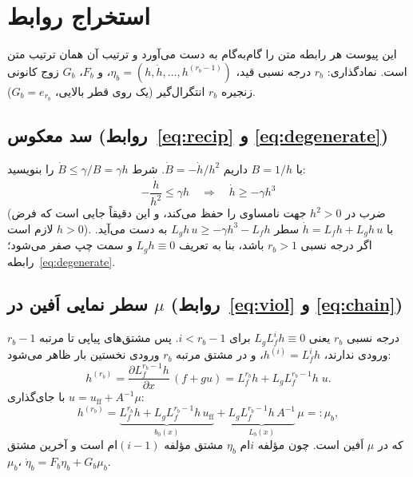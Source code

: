 \documentclass[10pt,twocolumn]{article}
\begin{document}
\onecolumn
\setcounter{section}{0}
\renewcommand{\thesection}{پ}
\renewcommand{\thesubsection}{پ-\arabic{subsection}}
\section{استخراج روابط}
\label{app:deriv}
این پیوست هر رابطه متن را گام‌به‌گام به دست می‌آورد و ترتیب آن همان ترتیب متن است.
نمادگذاری: $r_b$ درجه نسبی قید، $\eta_b=(h,\dot h,\ldots,h^{(r_b-1)})$، و
$F_b$، $G_b$ زوج کانونی زنجیره $r_b$ انتگرال‌گیر (یک روی قطر بالایی، $G_b=e_{r_b}$).

\subsection{سد معکوس (روابط~\eqref{eq:recip} و \eqref{eq:degenerate})}
با $B=1/h$ داریم $\dot B=-\dot h/h^{2}$. شرط $\dot B\le\gamma/B=\gamma h$ را بنویسید:
\begin{equation*}
    -\frac{\dot h}{h^{2}}\le\gamma h
    \quad\Longrightarrow\quad
    \dot h\ge-\gamma h^{3}
\end{equation*}
(ضرب در $h^2>0$ جهت نامساوی را حفظ می‌کند، و این دقیقاً جایی است که فرض $h>0$ لازم است).
با $\dot h=L_fh+L_gh\,u$ سطر $L_gh\,u\ge-\gamma h^3-L_fh$ به دست می‌آید. اگر درجه نسبی
$r_b>1$ باشد، بنا به تعریف $L_gh\equiv0$ و سمت چپ صفر می‌شود؛ رابطه~\eqref{eq:degenerate}.

\subsection{سطر نمایی اَفین در $\mu$ (روابط~\eqref{eq:viol} و \eqref{eq:chain})}
درجه نسبی $r_b$ یعنی $L_gL_f^{i}h\equiv0$ برای $i<r_b-1$. پس مشتق‌های پیاپی تا مرتبه
$r_b-1$ ورودی ندارند، $h^{(i)}=L_f^{i}h$، و در مشتق مرتبه $r_b$ ورودی نخستین بار ظاهر می‌شود:
\begin{equation*}
    h^{(r_b)}=\frac{\partial L_f^{r_b-1}h}{\partial x}\,(f+gu)=L_f^{r_b}h+L_gL_f^{r_b-1}h\;u .
\end{equation*}
با جای‌گذاری $u=u_{\mathrm{ff}}+A^{-1}\mu$:
\begin{equation*}
    h^{(r_b)}=\underbrace{L_f^{r_b}h+L_gL_f^{r_b-1}h\,u_{\mathrm{ff}}}_{b_0(x)}
    +\underbrace{L_gL_f^{r_b-1}h\,A^{-1}}_{L_b(x)}\,\mu=:\mu_b ,
\end{equation*}
که در $\mu$ اَفین است. چون مؤلفه $i$ام $\eta_b$ مشتق مؤلفه $(i-1)$ام است و آخرین مشتق $\mu_b$،
$\dot\eta_b=F_b\eta_b+G_b\mu_b$.
\end{document}
